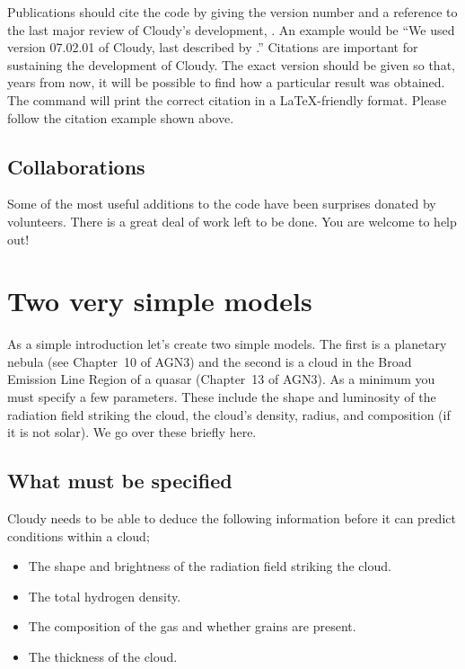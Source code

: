 \documentclass[12pt,twoside]{article}
\begin{document}
{Publications should cite the code by giving the version number and a
reference to the last major review of Cloudy's development,
\citet{CloudyReview}.
An example would be ``We used version 07.02.01 of Cloudy, last
described by \citet{CloudyReview}.''
Citations are important for sustaining the development of Cloudy.
The exact version should be given so that, years
from now, it will be possible to find how a particular result was obtained.
The command  will print the correct citation in a
\LaTeX-friendly format.
Please follow the citation example shown above.

\subsection{Collaborations}

Some of the most useful additions to the code have been surprises donated
by volunteers.  There is a great deal of work left to be done.  You are
welcome to help out!

\section{Two very simple models}
\label{sec:TwoVerySimpleModels}

As a simple introduction let's create two simple models.  The first is
a planetary nebula (see Chapter~10 of AGN3) and the second is a cloud in
the Broad Emission Line Region of a quasar (Chapter~13 of AGN3).  As a
minimum you must specify a few parameters.
These include the shape and luminosity of the radiation field
striking the cloud, the cloud's density, radius,
and composition (if it is not solar).
We go over these briefly here.

\subsection{What must be specified}

Cloudy needs to be able to deduce the following information before it
can predict conditions within a cloud;

\begin{itemize}
\item The shape and brightness of the radiation field striking the cloud.
\item The total hydrogen density.
\item The composition of the gas and whether grains are present.
\item The thickness of the cloud.
\end{itemize}

}
\end{document}
